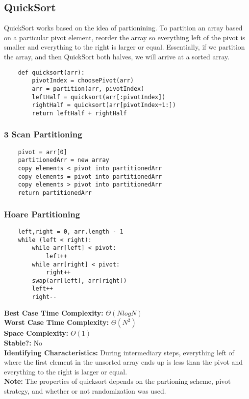 \documentclass{article}
\begin{document}
\subsection{QuickSort}
QuickSort works based on the idea of partionining. To partition an array based on a particular pivot element,
reorder the array so everything left of the pivot is smaller and everything to the right is larger or equal.
Essentially, if we partition the array, and then QuickSort both halves, we will arrive at a sorted array.
\begin{lstlisting}
    def quicksort(arr):
        pivotIndex = choosePivot(arr)
        arr = partition(arr, pivotIndex)
        leftHalf = quicksort(arr[:pivotIndex])
        rightHalf = quicksort(arr[pivotIndex+1:])
        return leftHalf + rightHalf
\end{lstlisting}
\subsubsection{3 Scan Partitioning}
\begin{lstlisting}
    pivot = arr[0]
    partitionedArr = new array
    copy elements < pivot into partitionedArr
    copy elements = pivot into partitionedArr
    copy elements > pivot into partitionedArr
    return partitionedArr
\end{lstlisting}
\subsubsection{Hoare Partitioning}
\begin{lstlisting}
    left,right = 0, arr.length - 1
    while (left < right):
        while arr[left] < pivot:
            left++
        while arr[right] < pivot:
            right++
        swap(arr[left], arr[right])
        left++
        right--
\end{lstlisting}
\textbf{Best Case Time Complexity: } $\Theta(NlogN)$\\
\textbf{Worst Case Time Complexity: } $\Theta(N^2)$\\
\textbf{Space Complexity: } $\Theta(1)$\\
\textbf{Stable?: } No\\
\textbf{Identifying Characteristics: } During intermediary steps, everything left of where the first element in the unsorted array
ends up is less than the pivot and everything to the right is larger or equal.\\
\textbf{Note: } The properties of quicksort depends on the partioning scheme, pivot strategy, and whether or not randomization was used.
\end{document}

